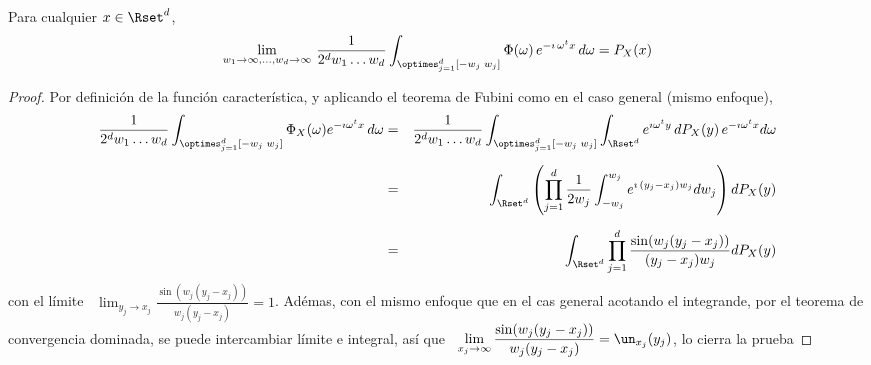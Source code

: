 {\begin{teorema}\label{Teo:MP:InversionMasa}
%
  Para cualquier $x \in \Rset^d$,
  \[
  \lim_{w_1  \to  \infty,\ldots,w_d \to  \infty} \,  \frac{1}{2^d  w_1 \ldots  w_d}
  \int_{\optimes_{j=1}^d [-w_j \; w_j]}  \Phi(\omega) \, e^{- \imath \, \omega^t x}
  \, d\omega = P_X(x)
  \]
\end{teorema}
%
\begin{proof}
  Por definici\'on de  la funci\'on caracter\'istica, y aplicando  el teorema de
  Fubini como en el caso general (mismo enfoque),
  \begin{eqnarray*}
  \frac{1}{2^d w_1 \ldots w_d} \int_{\optimes_{j=1}^d [-w_j \; w_j]}
  \Phi_X(\omega) e^{- \imath \omega^t x} \, d\omega & = & \frac{1}{2^d w_1 \ldots
  w_d} \int_{\optimes_{j=1}^d [-w_j \; w_j]} \int_{\Rset^d} e^{\imath \omega^t y}
  \, dP_X(y) \, e^{- \imath \omega^t x} d\omega\\[2mm]
  & = & \int_{\Rset^d} \left( \prod_{j=1}^d \frac{1}{2 w_j} \int_{-w_j}^{w_j}
  e^{\imath \, (y_j - x_j) w_j} dw_j \right) dP_X(y)\\[2mm]
  & = & \int_{\Rset^d} \prod_{j=1}^d \frac{\sin(w_j (y_j-x_j))}{(y_j-x_j) w_j}  dP_X(y)
  \end{eqnarray*}
  con   el  l\'imite   \  $\displaystyle   \lim_{y_j  \to   x_j}  \frac{\sin(w_j
    (y_j-x_j))}{w_j( y_j-x_j)}  = 1$. Ad\'emas, con  el mismo enfoque  que en el
  cas general acotando  el integrande, por el teorema  de convergencia dominada,
  se  puede  intercambiar  l\'imite  e  integral,  as\'i  que  \  $\displaystyle
  \lim_{x_j   \to   \infty}    \frac{\sin(w_j   (y_j-x_j))}{w_j(   y_j-x_j)}   =
  \un_{x_j}(y_j)$, lo cierra la prueba
\end{proof}

}
